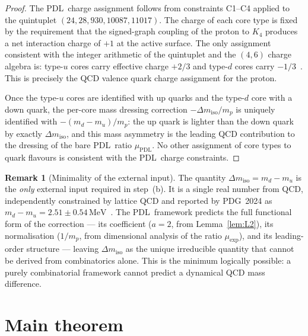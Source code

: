 \documentclass[11pt,a4paper]{article}
\theoremstyle{definition}
\newtheorem{remark}[theorem]{Remark}
\newcommand{\PDL}{\textnormal{PDL}}
\newcommand{\Kfour}{K_4}
\newcommand{\muPDL}{\mu_{\mathrm{PDL}}}
\newcommand{\muexp}{\mu_{\mathrm{exp}}}
\newcommand{\dmiso}{\Delta m_{\mathrm{iso}}}
\begin{document}
\begin{proof}
The \PDL\ charge assignment follows from constraints C1--C4 applied to the quintuplet $(24,28,930,10087,11017)$. The charge of each core type is fixed by the requirement that the signed-graph coupling of the proton to $\Kfour$ produces a net interaction charge of $+1$ at the active surface. The only assignment consistent with the integer arithmetic of the quintuplet and the $(4,6)$ charge algebra is: type-$u$ cores carry effective charge $+2/3$ and type-$d$ cores carry $-1/3$~\cite{Combinatorial_Proton_v2_2026}. This is precisely the QCD valence quark charge assignment for the proton.

Once the type-$u$ cores are identified with up quarks and the type-$d$ core with a down quark, the per-core mass dressing correction $-\dmiso/m_p$ is uniquely identified with $-(m_d - m_u)/m_p$: the up quark is lighter than the down quark by exactly $\dmiso$, and this mass asymmetry is the leading QCD contribution to the dressing of the bare \PDL\ ratio $\muPDL$. No other assignment of core types to quark flavours is consistent with the \PDL\ charge constraints.
\end{proof}

\begin{remark}[Minimality of the external input]
\label{rem:minimality}
The quantity $\dmiso = m_d - m_u$ is the \emph{only} external input required in step~(b). It is a single real number from QCD, independently constrained by lattice QCD and reported by PDG~2024 as $m_d - m_u = 2.51 \pm 0.54\,\mathrm{MeV}$~\cite{PDG_2024}. The \PDL\ framework predicts the full functional form of the correction --- its coefficient ($a=2$, from Lemma~\ref{lem:L2}), its normalisation ($1/m_p$, from dimensional analysis of the ratio $\muexp$), and its leading-order structure --- leaving $\dmiso$ as the unique irreducible quantity that cannot be derived from combinatorics alone. This is the minimum logically possible: a purely combinatorial framework cannot predict a dynamical QCD mass difference.
\end{remark}

\section{Main theorem}
\label{sec:main}
\end{document}
